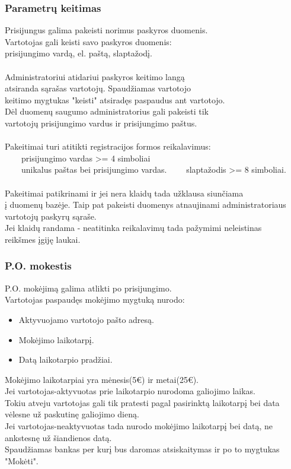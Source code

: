 \documentclass[a4paper,12pt]{article}
\newcommand{\tabitem}{~~\llap{\textbullet}~~}
\begin{document}
\subsubsection{Parametrų keitimas}
Prisijungus galima pakeisti norimus paskyros duomenis.\\
Vartotojas gali keisti savo paskyros duomenis: \\
	prisijungimo vardą, el. paštą, slaptažodį. \\\\
	
Administratoriui atidariui paskyros keitimo langą\\
atsiranda sąrašas vartotojų. Spaudžiamas vartotojo \\
keitimo mygtukas "keisti" atsiradęs paspaudus ant vartotojo.\\
Dėl duomenų saugumo administratorius gali pakeisti tik\\
vartotojų prisijungimo vardus ir prisijungimo paštus. \\\\

Pakeitimai turi atitikti registracijos formos reikalavimus: \\
	\tabitem prisijungimo vardas >= 4 simboliai\\
	\tabitem unikalus paštas bei prisijungimo vardas.
    \tabitem slaptažodis >= 8 simboliai. \\\\
    
Pakeitimai patikrinami ir jei nera klaidų tada užklausa siunčiama \\
į duomenų bazėje. Taip pat pakeisti duomenys atnaujinami administratoriaus \\
vartotojų paskyrų sąraše. \\
Jei klaidų randama - neatitinka reikalavimų tada pažymimi neleistinas \\
reikšmes įgiję laukai.\\

\subsubsection{P.O. mokestis}
P.O. mokėjimą galima atlikti po prisijungimo. \\
Vartotojas paspaudęs mokėjimo mygtuką nurodo:
\begin{itemize}
	\item Aktyvuojamo vartotojo pašto adresą.
	\item Mokėjimo laikotarpį.
	\item Datą laikotarpio pradžiai.
\end{itemize} 
Mokėjimo laikotarpiai yra mėnesis(5€) ir metai(25€). \\
Jei vartotojas-aktyvuotas prie laikotarpio nurodoma galiojimo laikas.\\
Tokiu atveju vartotojas gali tik pratesti pagal pasirinktą laikotarpį 
bei data vėlesne už paskutinę galiojimo dieną.\\
Jei vartotojas-neaktyvuotas tada nurodo mokėjimo laikotarpį bei datą,
ne ankstesnę už šiandienos datą. \\
Spaudžiamas bankas per kurį bus daromas atsiskaitymas ir po to mygtukas "Mokėti".
\end{document}
